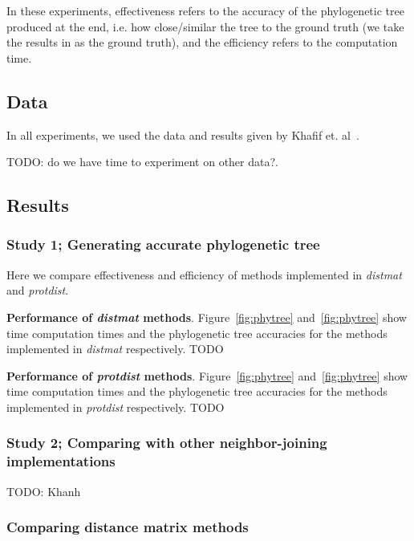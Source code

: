 \documentclass[11pt,letterpaper]{article}
\theoremstyle{definition}
\begin{document}
In these experiments, effectiveness refers to the accuracy of the phylogenetic tree produced at the end, i.e. how close/similar the tree to the ground truth (we take the results in \cite{khafif2014identification} as the ground truth), and the efficiency refers to the computation time. 

\subsection{Data}

In all experiments, we used the data and results given by Khafif et. al~\cite{khafif2014identification}. 

TODO: do we have time to experiment on other data?. 

\subsection{Results}

\subsubsection{Study 1; Generating accurate phylogenetic tree}

Here we compare effectiveness and efficiency of methods implemented in \textit{distmat} and \textit{protdist}. 

\textbf{Performance of \textit{distmat} methods}. Figure~\ref{fig:phytree} and~\ref{fig:phytree} show time computation times and the phylogenetic tree accuracies for the methods implemented in \textit{distmat} respectively. TODO

\textbf{Performance of \textit{protdist} methods}. Figure~\ref{fig:phytree} and~\ref{fig:phytree} show time computation times and the phylogenetic tree accuracies for the methods implemented in \textit{protdist} respectively. TODO 

\subsubsection{Study 2; Comparing with other neighbor-joining implementations}
 
TODO: Khanh 

\subsubsection{Comparing distance matrix methods}





\end{document}
